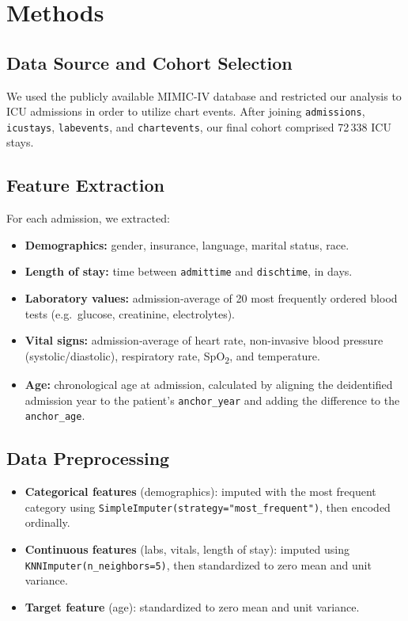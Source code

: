 \documentclass[manuscript,screen,review]{acmart}
\begin{document}
\section{Methods}

\subsection{Data Source and Cohort Selection}
We used the publicly available MIMIC-IV database and restricted our analysis to ICU admissions in order to utilize chart events. After joining \texttt{admissions}, \texttt{icustays}, \texttt{labevents}, and \texttt{chartevents}, our final cohort comprised 72\,338 ICU stays.

\subsection{Feature Extraction}
For each admission, we extracted:
\begin{itemize}
  \item \textbf{Demographics:} gender, insurance, language, marital status, race.
  \item \textbf{Length of stay:} time between \texttt{admittime} and \texttt{dischtime}, in days.
  \item \textbf{Laboratory values:} admission‐average of 20 most frequently ordered blood tests (e.g.\ glucose, creatinine, electrolytes).
  \item \textbf{Vital signs:} admission‐average of heart rate, non-invasive blood pressure (systolic/diastolic), respiratory rate, SpO\textsubscript{2}, and temperature.
  \item \textbf{Age:} chronological age at admission, calculated by aligning the deidentified admission year to the patient’s \texttt{anchor\_year} and adding the difference to the \texttt{anchor\_age}.
\end{itemize}

\subsection{Data Preprocessing}
\begin{itemize}
  \item \textbf{Categorical features} (demographics): imputed with the most frequent category using \texttt{SimpleImputer(strategy="most\_frequent")}, then encoded ordinally.
  \item \textbf{Continuous features} (labs, vitals, length of stay): imputed using \texttt{KNNImputer(n\_neighbors=5)}, then standardized to zero mean and unit variance.
  \item \textbf{Target feature} (age): standardized to zero mean and unit variance.
\end{itemize}
\end{document}
